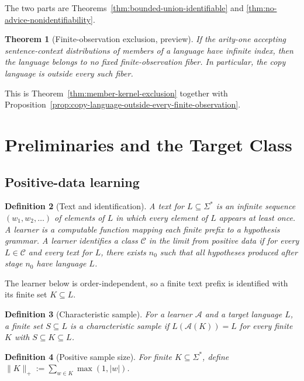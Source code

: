 \documentclass[11pt,a4paper]{article}
\newtheorem{theorem}{Theorem}[section]
\newtheorem{definition}[theorem]{Definition}
\theoremstyle{remark}
\begin{document}
The two parts are Theorems~\ref{thm:bounded-union-identifiable} and
\ref{thm:no-advice-nonidentifiability}.

\begin{theorem}[Finite-observation exclusion, preview]
\label{thm:main-exclusion-preview}
If the arity-one accepting sentence-context distributions of members of a
language have infinite index, then the language belongs to no fixed
finite-observation fiber.  In particular, the copy language is outside every
such fiber.
\end{theorem}

This is Theorem~\ref{thm:member-kernel-exclusion} together with
Proposition~\ref{prop:copy-language-outside-every-finite-observation}.

\section{Preliminaries and the Target Class}
\label{sec:prelim}

\subsection{Positive-data learning}

\begin{definition}[Text and identification]
A \emph{text} for \(L\subseteq\Sigma^*\) is an infinite sequence
\((w_1,w_2,\ldots)\) of elements of \(L\) in which every element of \(L\)
appears at least once.  A learner is a computable function mapping each finite
prefix to a hypothesis grammar.  A learner identifies a class \(\mathcal C\) in
the limit from positive data if for every \(L\in\mathcal C\) and every text for
\(L\), there exists \(n_0\) such that all hypotheses produced after stage
\(n_0\) have language \(L\).
\end{definition}

The learner below is order-independent, so a finite text prefix is identified
with its finite set \(K\subseteq L\).

\begin{definition}[Characteristic sample]
For a learner \(\mathcal A\) and a target language \(L\), a finite set
\(S\subseteq L\) is a \emph{characteristic sample} if
\(L(\mathcal A(K))=L\) for every finite \(K\) with \(S\subseteq K\subseteq L\).
\end{definition}

\begin{definition}[Positive sample size]
For finite \(K\subseteq\Sigma^*\), define \(\|K\|_+:=\sum_{w\in K}\max(1,|w|)\).
\end{definition}
\end{document}

